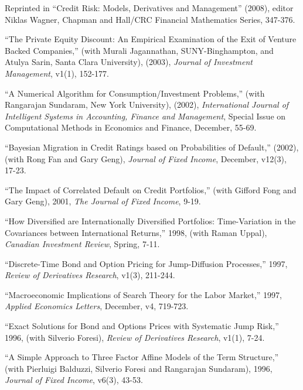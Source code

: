 \documentclass{article}
\begin{document}
\begin{etaremune}
Reprinted in ``Credit Risk: Models, Derivatives and Management'' (2008), editor Niklas Wagner, Chapman and Hall/CRC Financial Mathematics Series, 347-376.

\item ``The Private Equity Discount: An Empirical Examination of the
Exit of Venture Backed Companies,'' (with Murali Jagannathan,
SUNY-Binghampton, and Atulya Sarin, Santa Clara University), (2003),
{\it Journal of Investment Management}, v1(1), 152-177.


\item ``A Numerical Algorithm for Consumption/Investment Problems,''
(with Rangarajan Sundaram, New York University), (2002), 
{\it International Journal of Intelligent Systems
in Accounting, Finance and Management}, Special Issue on
Computational Methods in Economics and Finance, December, 55-69.


\item ``Bayesian Migration in Credit Ratings based on Probabilities
of Default,''  (2002), (with Rong Fan and Gary Geng), {\it
Journal of Fixed Income}, December, v12(3), 17-23.

\item ``The Impact of Correlated Default on Credit Portfolios,''
(with Gifford Fong and Gary Geng), 2001, {\it The Journal 
of Fixed Income}, 9-19.

\item
``How Diversified are Internationally Diversified Portfolios:
Time-Variation in the Covariances between International Returns,''
1998, (with Raman Uppal), {\it Canadian Investment Review}, Spring, 7-11.

\item
``Discrete-Time Bond and Option Pricing for Jump-Diffusion
Processes,'' 1997, {\it Review of Derivatives Research}, v1(3), 211-244.  

\item
``Macroeconomic Implications of Search Theory for the Labor Market,''
1997, {\it Applied Economics Letters}, December, v4, 719-723.
 

\item
``Exact Solutions for Bond and Options Prices
with Systematic Jump Risk,'' 1996, (with Silverio Foresi),
{\it Review of Derivatives Research}, v1(1), 7-24.  

\item
``A Simple Approach to Three Factor Affine Models of the
Term Structure,'' (with Pierluigi Balduzzi, Silverio Foresi and Rangarajan
Sundaram), 1996, {\it Journal of Fixed Income}, v6(3), 43-53.


\end{etaremune}
\end{document}
